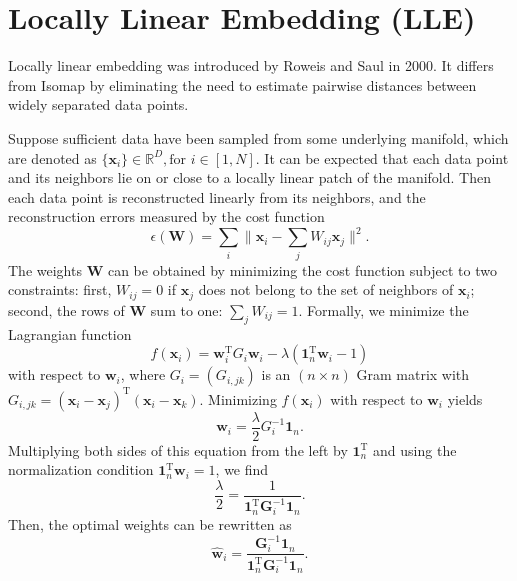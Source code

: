 \section{Locally Linear Embedding (LLE)\label{Sec:DR:LLE}}
Locally linear embedding was introduced by Roweis and Saul in 2000.\cite{RoweisScience2000} It differs from Isomap by eliminating the need to estimate pairwise distances between widely separated data points.

Suppose sufficient data have been sampled from some underlying manifold, which are denoted as $\{\mathbf{x}_i\}\in \mathbb{R}^D, \text{for }i\in [1,N]$. It can be expected that each data point and its neighbors lie on or close to a locally linear patch of the manifold. Then each data point is reconstructed linearly from its neighbors, and the reconstruction errors measured by the cost function
\begin{equation}
	\epsilon(\mathbf{W})=\sum_i\lVert \mathbf{x}_i-\sum_j W_{ij}\mathbf{x}_j\rVert^2.
\end{equation}
The weights $\mathbf{W}$ can be obtained by minimizing the cost function subject to two constraints: first, $W_{ij}=0$ if $\mathbf{x}_j$ does not belong to the set of neighbors of $\mathbf{x}_i$; second, the rows of $\mathbf{W}$ sum to one: $\sum_j W_{ij}=1$. Formally, we minimize the Lagrangian function
\begin{equation}
	f(\mathbf{x}_i)=\mathbf{w}_i^{\operatorname{T}}G_i\mathbf{w}_i-\lambda \left(\mathbf{1}_n^{\operatorname{T}}\mathbf{w}_i-1\right)
\end{equation}
with respect to $\mathbf{w}_i$, where $G_i=(G_{i,jk})$ is an $(n\times n)$ Gram matrix with $G_{i,jk}=(\mathbf{x}_i-\mathbf{x}_j)^{\operatorname{T}}(\mathbf{x}_i-\mathbf{x}_k)$. Minimizing $f(\mathbf{x}_i)$ with respect to $\mathbf{w}_i$ yields
\begin{equation}
	\widehat{\mathbf{w}}_i=\frac{\lambda}{2}G_{i}^{-1}\mathbf{1}_n.
\end{equation}
Multiplying both sides of this equation from the left by $\mathbf{1}_n^{\operatorname{T}}$ and using the normalization condition $\mathbf{1}_n^{\operatorname{T}}\mathbf{w}_i=1$, we find
\begin{equation}
	\frac{\lambda}{2}=\frac{1}{\mathbf{1}_n^{\operatorname{T}}\mathbf{G}_i^{-1}\mathbf{1}_n}.
\end{equation}
Then, the optimal weights can be rewritten as
\begin{equation}
	\widehat{\mathbf{w}}_i=\frac{\mathbf{G}_i^{-1}\mathbf{1}_n}{\mathbf{1}_n^{\operatorname{T}}\mathbf{G}_i^{-1}\mathbf{1}_n}.
\end{equation}

